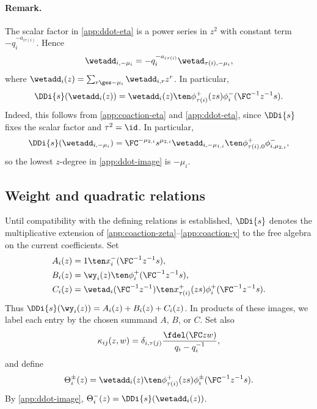 \documentclass[reqno]{amsart}
\numberwithin{equation}{section}
\newenvironment{remark}{\medskip\paragraph{{\bf Remark.}}}{\par\medskip}
\begin{document}
\begin{remark}
	The scalar factor in \eqref{app:ddot-eta} is a power series in $z^2$ with constant term 
	$-q_i^{-a_{i\tau(i)}}$. Hence
	\[
	\wetadd_{i,-\mu_i}=-q_i^{-a_{i\tau(i)}}\wetad_{\tau(i),-\mu_i},
	\]
	where $\wetadd_i(z)=\sum_{r\ges-\mu_i}\wetadd_{i,r}z^r$.
	In particular,
	\begin{equation}
		\DDi{s}(\wetadd_i(z))
		=\wetadd_i(z)\ten
		\phi_{\tau(i)}^+(zs)\phi_i^-({\FC^{-1}z^{-1}} s).
		\label{app:ddot-image}
	\end{equation}
	Indeed, this follows from \eqref{app:coaction-eta} and \eqref{app:ddot-eta}, since $\DDi{s}$ fixes the scalar factor and $\tau^2=\id$. In particular,
	\[
	\DDi{s}(\wetadd_{i,-\mu_i})=\FC^{-\mu_{2,i}}s^{\mu_{2,i}}
	\wetadd_{i,-\mu_{1,i}}\ten\phi_{\tau(i),0}^+\phi_{i,\mu_{2,i}}^-,
	\]
	so the lowest $z$-degree in \eqref{app:ddot-image} is $-\mu_i$.
	\hfill\rmkend
\end{remark}

\subsection{Weight and quadratic relations}
\label{app:quadratic-prop}
Until compatibility with the defining relations is established, $\DDi{s}$ denotes the 
multiplicative extension of \eqref{app:coaction-zeta}--\eqref{app:coaction-y} to the free 
algebra on the current coefficients.
Set
\begin{equation}
	\begin{aligned}
		A_i(z)&=1\ten x_i^-({\FC^{-1}z^{-1}} s),\\
		B_i(z)&=\wy_i(z)\ten\phi_i^+({\FC^{-1}z^{-1}} s),\\
		C_i(z)&=\wetad_i({\FC^{-1}z^{-1}})\ten x_{\tau(i)}^+(zs)\phi_i^+({\FC^{-1}z^{-1}} s).
	\end{aligned}
	\label{app:ABC}
\end{equation}
Thus $\DDi{s}(\wy_i(z))=A_i(z)+B_i(z)+C_i(z)$. In products of these images, we label 
each entry by the chosen summand $A$, $B$, or $C$.
Set also
\begin{equation}
	\kappa_{ij}(z,w)=
	\delta_{i,\tau(j)}
	\frac{\fdel(\FC zw)}{q_i-q_i^{-1}},
	\label{app:kappa}
\end{equation}
and define
\[
\Theta_i^\pm(z)=\wetadd_i(z)\ten\phi_{\tau(i)}^+(zs)\phi_i^\pm({\FC^{-1}z^{-1}} s).
\]
By \eqref{app:ddot-image}, $\Theta_i^-(z)=\DDi{s}(\wetadd_i(z))$.
\end{document}
